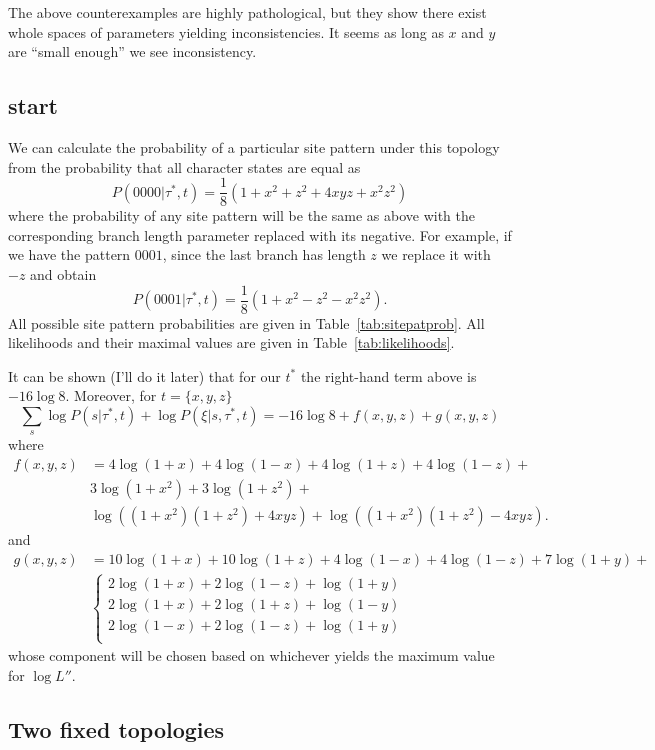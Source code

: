The above counterexamples are highly pathological, but they show there exist whole spaces of parameters yielding inconsistencies.
It seems as long as $x$ and $y$ are ``small enough'' we see inconsistency.

\subsection{start}

We can calculate the probability of a particular site pattern under this topology from the probability that all character states are equal as
$$
P(0000|\tau^*,t) = \frac{1}{8}(1+x^2+z^2+4xyz+x^2z^2)
$$
where the probability of any site pattern will be the same as above with the corresponding branch length parameter replaced with its negative.
For example, if we have the pattern $0001$, since the last branch has length $z$ we replace it with $-z$ and obtain
$$
P(0001|\tau^*,t) = \frac{1}{8}(1+x^2-z^2-x^2z^2).
$$
All possible site pattern probabilities are given in Table~\ref{tab:sitepatprob}.
All likelihoods and their maximal values are given in Table~\ref{tab:likelihoods}.

It can be shown (I'll do it later) that for our $t^*$ the right-hand term above is $-16\log 8$.
Moreover, for $t=\{x,y,z\}$
\begin{equation}
\sum_{s} \log P(s | \tau^*, t) + \log P(\xi | s, \tau^*, t) = -16\log 8 + f(x,y,z) + g(x,y,z)
\end{equation}
where
\begin{align}
f(x,y,z) &= 4\log(1+x)+4\log(1-x)+4\log(1+z)+4\log(1-z)+\\
& 3\log(1+x^2)+3\log(1+z^2)+\\
& \log((1+x^2)(1+z^2)+4xyz) + \log((1+x^2)(1+z^2)-4xyz).
\end{align}
and
\begin{align}
g(x,y,z) &= 10\log(1+x)+10\log(1+z)+4\log(1-x)+4\log(1-z)+7\log(1+y)+\\
& \left\{ 
  \begin{array}{l}
  2\log(1+x)+2\log(1-z)+\log(1+y)\\
  2\log(1+x)+2\log(1+z)+\log(1-y)\\
  2\log(1-x)+2\log(1-z)+\log(1+y)\\
  \end{array} \right.
\end{align}
whose component will be chosen based on whichever yields the maximum value for $\log L''$.

\subsection{Two fixed topologies}

